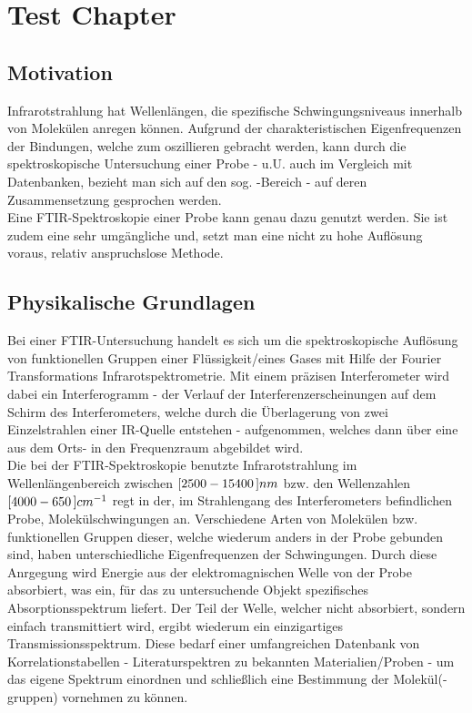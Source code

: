 
\chapter{Test Chapter} %

\label{Chapter}

\section{Motivation}

Infrarotstrahlung hat Wellenl\"angen, die spezifische Schwingungsniveaus innerhalb von Molek\"ulen anregen k\"onnen. Aufgrund der charakteristischen Eigenfrequenzen der Bindungen, welche zum oszillieren gebracht werden, kann durch die spektroskopische Untersuchung einer Probe - u.U. auch im Vergleich mit  Datenbanken, bezieht man sich auf den sog. -Bereich - auf deren Zusammensetzung gesprochen werden.\\
Eine FTIR-Spektroskopie einer Probe kann genau dazu genutzt werden. Sie ist zudem eine sehr umg\"angliche und, setzt man eine nicht zu hohe Aufl\"osung voraus, relativ anspruchslose Methode.

\section{Physikalische Grundlagen}

Bei einer FTIR-Untersuchung handelt es sich um die spektroskopische Aufl\"osung von funktionellen Gruppen einer Fl\"ussigkeit/eines Gases mit Hilfe der Fourier Transformations Infrarotspektrometrie. Mit einem pr\"azisen Interferometer wird dabei ein Interferogramm - der Verlauf der Interferenzerscheinungen auf dem Schirm des Interferometers, welche durch die \"Uberlagerung von zwei Einzelstrahlen einer IR-Quelle entstehen - aufgenommen, welches dann \"uber eine  aus dem Orts- in den Frequenzraum abgebildet wird.\\
Die bei der FTIR-Spektroskopie benutzte Infrarotstrahlung im Wellenl\"angenbereich zwischen $\unit[[2500-15400]]{nm}$ bzw. den Wellenzahlen $\unit[[4000-650]]{cm^{-1}}$ regt in der, im Strahlengang des Interferometers befindlichen Probe, Molek\"ulschwingungen an. Verschiedene Arten von Molek\"ulen bzw. funktionellen Gruppen dieser, welche wiederum anders in der Probe gebunden sind, haben unterschiedliche Eigenfrequenzen der Schwingungen. Durch diese Anrgegung wird Energie aus der elektromagnischen Welle von der Probe absorbiert, was ein, f\"ur das zu untersuchende Objekt spezifisches Absorptionsspektrum liefert. Der Teil der Welle, welcher nicht absorbiert, sondern einfach transmittiert wird, ergibt wiederum ein einzigartiges Transmissionsspektrum. Diese  bedarf einer umfangreichen Datenbank von Korrelationstabellen - Literaturspektren zu bekannten Materialien/Proben - um das eigene Spektrum einordnen und schlie{\ss}lich eine Bestimmung der Molek\"ul(-gruppen) vornehmen zu k\"onnen.

